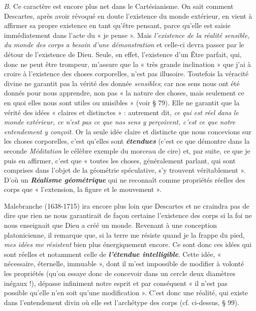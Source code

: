 {\it B.} Ce caractère est encore plus net dans le Cartésianisme. On
sait comment Descartes, après avoir révoqué en doute l’existence
du monde extérieur, en vient à affirmer sa propre existence en tant
qu’être pensant, parce qu’elle est saisie immédiatement dans l’acte
du « je pense ». Mais {\it l'existence de la réalité sensible, du monde des
corps a besoin d’une démonstration} et celle-ci devra passer par le détour
de l’existence de Dieu. Seule, en effet, l’existence d’un Être parfait,
qui, donc ne peut être trompeur, m’assure que la « très grande inclination »
que j'ai à croire à l'existence des choses corporelles, n’est pas
illusoire. Toutefois la véracité divine ne garantit pas la vérité des
donnée {\it sensibles}; car nos sens nous ont été donnés pour nous
apprendre, non pas « la nature des choses, mais seulement ce en quoi
elles nous sont utiles ou nuisibles » (voir § 79). Elle ne garantit que la
vérité des idées « claires et distinctes » : autrement dit, {\it ce qui est réel
dans le monde extérieur, ce n’est pas ce que nos sens y perçoivent, c’est ce
que notre entendement y conçoit}. Or la seule idée claire et distincte que
nous concevions sur les choses corporelles, c’est qu’elles sont \textbf{\textit {étendues}}
(c’est ce que démontre dans la seconde {\it Méditation} le célèbre
exemple du morceau de cire) et, par suite, ce que je puis en affirmer,
c’est que « toutes les choses, généralement parlant, qui sont comprises
dans l’objet de la géométrie spéculative, s’y trouvent véritablement ».
D'où un \textbf{\textit {Réalisme géométrique}} qui ne reconnaît comme propriétés
réelles des corps que « l’extension, la figure et le mouvement ».

Malebranche (1638-1715) ira encore plus loin que Descartes
et ne craindra pas de dire que rien ne nous garantirait de façon certaine
l'existence des corps si la foi ne nous enseignait que Dieu a
créé un monde. Revenant à une conception platonicienne, il remarque
que, si la terre me résiste quand je la frappe du pied, {\it mes idées me
résistent} bien plus énergiquement encore. Ce sont donc ces idées qui
sont réelles et notamment celle de \textbf{\textit {l'étendue intelligible}}. Cette idée,
« nécessaire, éternelle, immuable », dont il m’est impossible de modifier
à volonté les propriétés (qu’on essaye donc de concevoir dans un
cercle deux diamètres inégaux !), dépasse infiniment notre esprit et
par conséquent « il n’est pas possible qu’elle n’en soit qu’une modification ».
C’est donc une réalité, qui existe dans l’entendement divin
où elle est l’archétype des corps (cf. ci-dessus, § 99).

